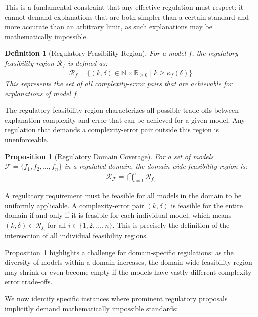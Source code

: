 \documentclass[11pt,letter,leqno]{article}
\newtheorem{proposition}[theorem]{Proposition}
\newtheorem{definition}[theorem]{Definition}
\begin{document}
This is a fundamental constraint that any effective regulation must respect: it cannot demand explanations that are both simpler than a certain standard and more accurate than an arbitrary limit, as such explanations may be mathematically impossible.

\begin{definition}[Regulatory Feasibility Region]
\label{def:feasibility-region}
For a model $f$, the regulatory feasibility region $\mathcal{R}_f$ is defined as:
\begin{align}
\mathcal{R}_f = \{(k, \delta) \in \mathbb{N} \times \mathbb{R}_{\geq 0} \mid k \geq \kappa_f(\delta)\}
\end{align}
This represents the set of all complexity-error pairs that are achievable for explanations of model $f$.
\end{definition}

The regulatory feasibility region characterizes all possible trade-offs between explanation complexity and error that can be achieved for a given model.  Any regulation that demands a complexity-error pair outside this region is unenforceable.

\begin{proposition}[Regulatory Domain Coverage]
\label{prop:domain-coverage}
For a set of models $\mathcal{F} = \{f_1, f_2, \ldots, f_n\}$ in a regulated domain, the domain-wide feasibility region is:
\begin{align}
\mathcal{R}_{\mathcal{F}} = \bigcap_{i=1}^{n} \mathcal{R}_{f_i}
\end{align}
\end{proposition}

A regulatory requirement must be feasible for all models in the domain to be uniformly applicable.  A complexity-error pair $(k, \delta)$ is feasible for the entire domain if and only if it is feasible for each individual model, which means $(k, \delta) \in \mathcal{R}_{f_i}$ for all $i \in \{1, 2, \ldots, n\}$.  This is precisely the definition of the intersection of all individual feasibility regions.

Proposition~\ref{prop:domain-coverage} highlights a challenge for domain-specific regulations: as the diversity of models within a domain increases, the domain-wide feasibility region may shrink or even become empty if the models have vastly different complexity-error trade-offs.

We now identify specific instances where prominent regulatory proposals implicitly demand mathematically impossible standards:
\end{document}

